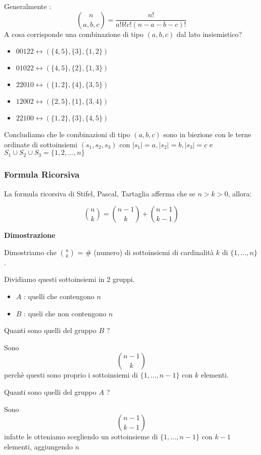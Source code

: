 \documentclass[11pt]{article}
\begin{document}
			Generalmente :
			\[
				\binom{n}{a,b,c} = \frac{n!}{a! b! c! (n-a-b-c)!}
			\]
			A cosa corrisponde una combinazione di tipo $(a,b,c)$ dal lato
			insiemistico?

			\begin{itemize}
				\item $00122 \longleftrightarrow (\{4,5\}, \{3\}, \{1,2\})$
				\item $01022 \longleftrightarrow (\{4,5\}, \{2\}, \{1,3\})$
				\item $22010 \longleftrightarrow (\{1,2\}, \{4\}, \{3,5\})$
				\item $12002 \longleftrightarrow (\{2,5\}, \{1\}, \{3,4\})$
				\item $22100 \longleftrightarrow (\{1,2\}, \{3\}, \{4,5\})$
			\end{itemize}

			Concludiamo che le combinazioni di tipo $(a,b,c)$ sono in biezione
			con le terne ordinate di sottoinsiemi $(s_1,s_2,s_3)$ con $|s_1| = a
			, |s_2| = b, |s_3| = c$ e $S_1 \cup S_2 \cup S_3 = \{1,2,\ldots,n\}$

			\subsubsection{Formula Ricorsiva}	
			
			La formula ricorsiva di Stifel, Pascal, Tartaglia afferma che
			se $n>k>0$, allora:

			\[
				\binom{n}{k} = \binom{n-1}{k} + \binom{n-1}{k-1}
			\]

			\textbf{\large Dimostrazione}

			Dimostriamo che $\binom{n}{k}$ = \# (numero) di sottoinsiemi di
			cardinalit\`a $k$ di $\{1,\ldots,n\}$.

			Dividiamo questi sottoinsiemi in $2$ gruppi.
			
			\begin{itemize}
				\item $A$ : quelli che contengono $n$
				\item $B$ : queli che non contengono $n$
			\end{itemize}

			Quanti sono quelli del gruppo $B$ ?

			Sono \[\binom{n-1}{k}\] perchè questi sono proprio i sottoinsiemi
			di $\{1,\ldots,n-1\}$ con $k$ elementi.

			Quanti sono quelli del gruppo $A$ ?

			Sono \[\binom{n-1}{k-1}\] infatte le otteniamo scegliendo un
			sottoinsieme di $\{1,\ldots,n-1\}$ con $k-1$ elementi, aggiungendo $n$
\end{document}
